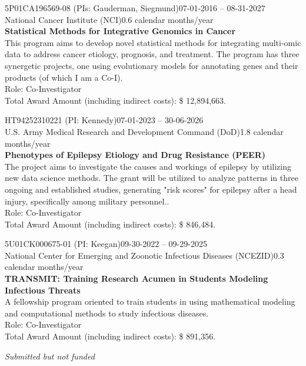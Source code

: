 \documentclass[letterpaper, 10pt]{article}
\renewcommand{\textbf}[1]{{\bfseries\color{teal}#1}}
\begin{document}
\noindent 5P01CA196569-08 (PIs: Gauderman, Siegmund)\hfill 07-01-2016 -- 08-31-2027\\
National Cancer Institute (NCI)\hfill 0.6 calendar months/year\\
\textbf{Statistical Methods for Integrative Genomics in Cancer}\\
This program aims to develop novel statistical methods for integrating multi-omic data to address cancer etiology, prognosis, and treatment. The program has three synergetic projects, one using evolutionary models for annotating genes and their products (of which I am a Co-I). \\
Role: Co-Investigator\\
Total Award Amount (including indirect costs): \$ 12,894,663. \vspace{.5cm}

\noindent HT94252310221 (PI: Kennedy)\hfill 07-01-2023 -- 30-06-2026\\
U.S. Army Medical Research and Development Command (DoD)\hfill 1.8 calendar months/year\\
\textbf{Phenotypes of Epilepsy Etiology and Drug Resistance (PEER)}\\
The project aims to investigate the causes and workings of epilepsy by utilizing new data science methods. The grant will be utilized to analyze patterns in three ongoing and established studies, generating "risk scores" for epilepsy after a head injury, specifically among military personnel..\\
Role: Co-Investigator\\
Total Award Amount (including indirect costs): \$ 846,484. \vspace{.5cm}

\noindent 5U01CK000675-01 (PI: Keegan)\hfill 09-30-2022 -- 09-29-2025\\
National Center for Emerging and Zoonotic Infectious Diseases (NCEZID)\hfill 0.3 calendar months/year\\
\textbf{TRANSMIT: Training Research Acumen in Students Modeling Infectious Threats}\\
A fellowship program oriented to train students in using mathematical modeling and computational methods to study infectious diseases.\\
Role: Co-Investigator\\
Total Award Amount (including indirect costs): \$ 891,356. \vspace{.5cm}

\noindent \textit{Submitted but not funded}\\
\end{document}
